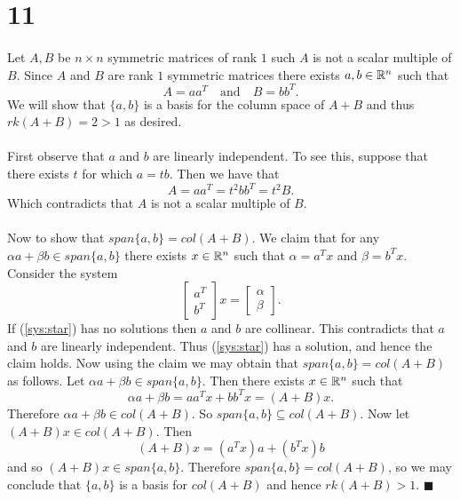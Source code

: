 \documentclass[letterpaper,12pt,oneside,onecolumn]{article}
\begin{document}
\section*{11}
\paragraph{}
Let $A, B$ be $n \times n$ symmetric matrices of rank $1$ such $A$ is not a scalar multiple of $B$. Since $A$ and $B$ are rank $1$ symmetric matrices there exists $a, b \in \mathbb{R}^n$ such that $$A = aa^T \quad \text{and}\quad B = bb^T.$$
We will show that $\{a,b\}$ is a basis for the column space of $A+B$ and thus $rk(A+B) = 2 > 1$ as desired.
\paragraph{}
First observe that $a$ and $b$ are linearly independent. To see this, suppose that there exists $t$ for which $a = tb$. Then we have that $$A = aa^T = t^2bb^T = t^2B.$$
Which contradicts that $A$ is not a scalar multiple of $B$.
\paragraph{}
Now to show that $span\{a,b\} = col(A+B)$. We claim that for any $\alpha a + \beta b \in span \{a,b\}$ there exists $x \in \mathbb{R}^n$ such that $\alpha = a^Tx$ and $\beta = b^Tx$. Consider the system
\begin{equation} \begin{bmatrix} a^T \\b^T\end{bmatrix} x = \begin{bmatrix}\alpha \\ \beta\end{bmatrix}. \label{sys:star}\end{equation}
If (\ref{sys:star}) has no solutions then $a$ and $b$ are collinear. This contradicts that $a$ and $b$ are linearly independent. Thus (\ref{sys:star}) has a solution, and hence the claim holds. Now using the claim we may obtain that $span\{a,b\} = col(A+B)$ as follows. Let $\alpha a + \beta b \in span\{a,b\}$. Then there exists $x \in \mathbb{R}^n$ such that $$\alpha a + \beta b = aa^Tx + bb^Tx = (A+B)x.$$
Therefore $\alpha a + \beta b \in col(A+B)$. So $span\{a,b\} \subseteq col(A+B)$. Now let $(A+B)x \in col(A+B)$. Then $$(A+B)x = (a^Tx)a + (b^Tx)b$$
and so $(A+B)x \in span\{a,b\}.$ Therefore $span\{a,b\} = col(A+B)$, so we may conclude that $\{a,b\}$ is a basis for $col(A+B)$ and hence $rk(A+B) > 1$. $\blacksquare$
\end{document}
